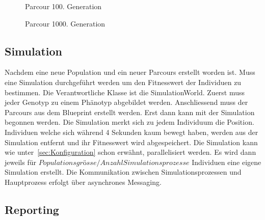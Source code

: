       \begin{figure}[H]
        \centering
        
        \caption{Parcour 100. Generation\label{fig:parcours2}}
      \end{figure}

      \begin{figure}[H]
        \centering
        
        \caption{Parcour 1000. Generation\label{fig:parcours3}}
      \end{figure}

      \subsection{Simulation\label{sec:simulation}}

      Nachdem eine neue Population und ein neuer Parcours erstellt worden ist.
      Muss eine Simulation durchgeführt werden um den Fitnesswert der Individuen zu bestimmen.
      Die Verantwortliche Klasse ist die SimulationWorld.
      Zuerst muss jeder Genotyp zu einem Phänotyp abgebildet werden.
      Anschliessend muss der Parcours aus dem Blueprint erstellt werden.
      Erst dann kann mit der Simulation begonnen werden.
      Die Simulation merkt sich zu jedem Individuum die Position.
      Individuen welche sich während 4 Sekunden kaum bewegt haben,
      werden aus der Simulation entfernt und ihr Fitnesswert wird abgespeichert.
      Die Simulation kann wie unter~\ref{sec:Konfiguration} schon erwähnt, parallelisiert werden.
      Es wird dann jeweils für \( Populationsgrösse / Anzahl Simulationsprozesse \) Individuen eine eigene Simulation erstellt.
      Die Kommunikation zwischen Simulationsprozessen und Hauptprozess erfolgt über asynchrones Messaging.

    \subsection{Reporting\label{subsec:Reporting}}

